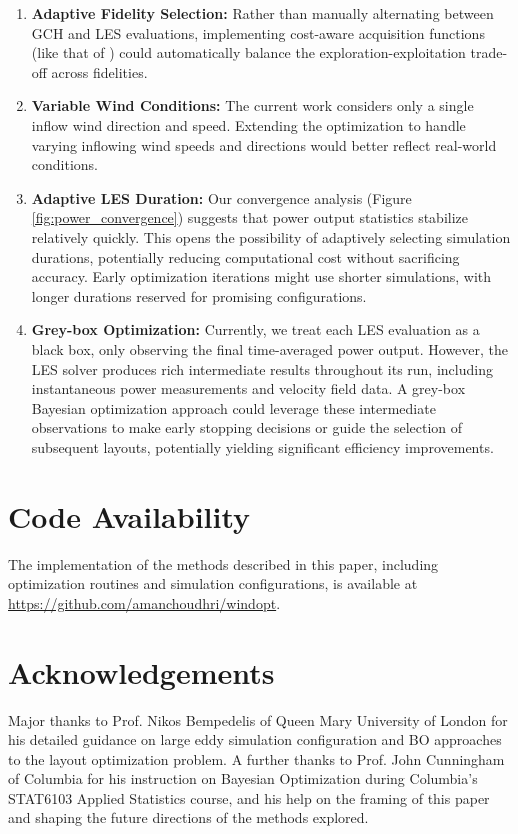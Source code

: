 \documentclass[11pt]{article}
\begin{document}
\begin{enumerate}
    \item \textbf{Adaptive Fidelity Selection:} Rather than manually
        alternating between GCH and LES evaluations, implementing cost-aware
        acquisition functions (like that of \cite{wuPracticalMultifidelityBayesian2019}) could
        automatically balance the exploration-exploitation trade-off across
        fidelities.     
    \item \textbf{Variable Wind Conditions:} The current work considers only a
        single inflow wind direction and speed. Extending the optimization to handle
        varying inflowing wind speeds and directions would better reflect real-world conditions.
    
    \item \textbf{Adaptive LES Duration:} Our convergence analysis (Figure
        \ref{fig:power_convergence}) suggests that power output statistics
        stabilize relatively quickly. This opens the possibility of adaptively
        selecting simulation durations, potentially reducing computational cost
        without sacrificing accuracy. Early optimization iterations might use
        shorter simulations, with longer durations reserved for promising
        configurations.

    \item \textbf{Grey-box Optimization:} Currently, we treat each LES
        evaluation as a black box, only observing the final time-averaged power
        output. However, the LES solver produces rich intermediate results
        throughout its run, including instantaneous power measurements and
        velocity field data. A grey-box Bayesian optimization approach could
        leverage these intermediate observations to make early stopping
        decisions or guide the selection of subsequent layouts, potentially
        yielding significant efficiency improvements.
\end{enumerate}

\section{Code Availability}
The implementation of the methods described in this paper, including
optimization routines and simulation configurations, is available at
\href{https://github.com/amanchoudhri/windopt}{https://github.com/amanchoudhri/windopt}.

\section{Acknowledgements}
Major thanks to Prof. Nikos Bempedelis of Queen Mary University of London for
his detailed guidance on large eddy simulation configuration and BO approaches
to the layout optimization problem. A further thanks to Prof. John Cunningham
of Columbia for his instruction on Bayesian Optimization during Columbia's STAT6103 Applied Statistics
course, and his help on the framing of this paper and shaping the
future directions of the methods explored.
\end{document}
